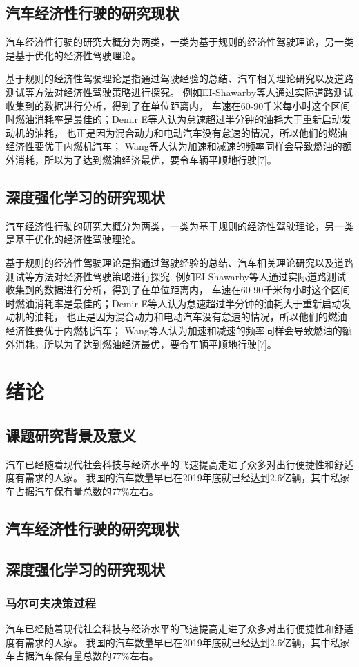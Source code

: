 \section{汽车经济性行驶的研究现状}
\par  汽车经济性行驶的研究大概分为两类，一类为基于规则的经济性驾驶理论，另一类是基于优化的经济性驾驶理论。
\par  基于规则的经济性驾驶理论是指通过驾驶经验的总结、汽车相关理论研究以及道路测试等方法对经济性驾驶策略进行探究。
例如EI-Shawarby等人通过实际道路测试收集到的数据进行分析，得到了在单位距离内，
车速在60-90千米每小时这个区间时燃油消耗率是最佳的；Demir E等人认为怠速超过半分钟的油耗大于重新启动发动机的油耗，
也正是因为混合动力和电动汽车没有怠速的情况，所以他们的燃油经济性要优于内燃机汽车；
Wang等人认为加速和减速的频率同样会导致燃油的额外消耗，所以为了达到燃油经济最优，要令车辆平顺地行驶[7]。

\section{深度强化学习的研究现状}
\par  汽车经济性行驶的研究大概分为两类，一类为基于规则的经济性驾驶理论，另一类是基于优化的经济性驾驶理论。
\par  基于规则的经济性驾驶理论是指通过驾驶经验的总结、汽车相关理论研究以及道路测试等方法对经济性驾驶策略进行探究.
例如EI-Shawarby等人通过实际道路测试收集到的数据进行分析，得到了在单位距离内，
车速在60-90千米每小时这个区间时燃油消耗率是最佳的；Demir E等人认为怠速超过半分钟的油耗大于重新启动发动机的油耗，
也正是因为混合动力和电动汽车没有怠速的情况，所以他们的燃油经济性要优于内燃机汽车；
Wang等人认为加速和减速的频率同样会导致燃油的额外消耗，所以为了达到燃油经济最优，要令车辆平顺地行驶[7]。

\chapter{绪论}
\section{课题研究背景及意义}
汽车已经随着现代社会科技与经济水平的飞速提高走进了众多对出行便捷性和舒适度有需求的人家。
我国的汽车数量早已在2019年底就已经达到2.6亿辆，其中私家车占据汽车保有量总数的77\%左右。
\section{汽车经济性行驶的研究现状}
\section{深度强化学习的研究现状}
\subsection{马尔可夫决策过程}
汽车已经随着现代社会科技与经济水平的飞速提高走进了众多对出行便捷性和舒适度有需求的人家。
我国的汽车数量早已在2019年底就已经达到2.6亿辆，其中私家车占据汽车保有量总数的77\%左右。

